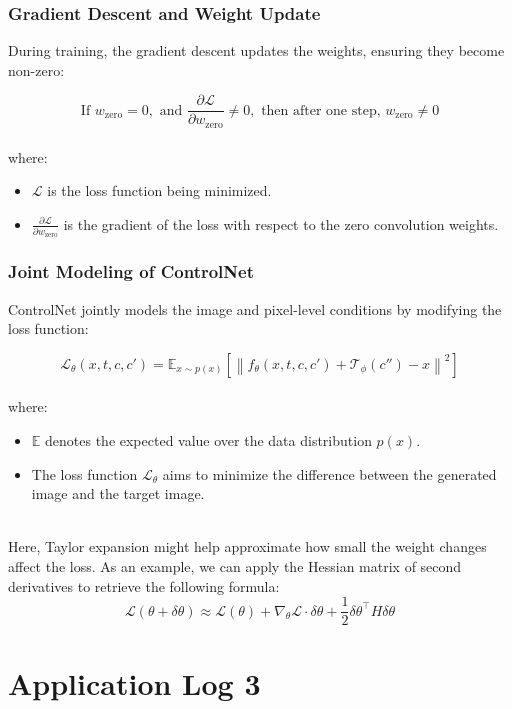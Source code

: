\documentclass[12pt]{article}
\begin{document}
\subsubsection*{Gradient Descent and Weight Update}

During training, the gradient descent updates the weights, ensuring they become non-zero:

\[
\text{If } w_{\text{zero}} = 0, \text{ and } \frac{\partial \mathcal{L}}{\partial w_{\text{zero}}} \neq 0, \text{ then after one step, } w_{\text{zero}} \neq 0
\]
\\
where:
\begin{itemize}
    \item $\mathcal{L}$ is the loss function being minimized.
    \item $\frac{\partial \mathcal{L}}{\partial w_{\text{zero}}}$ is the gradient of the loss with respect to the zero convolution weights.
\end{itemize}

\subsubsection*{Joint Modeling of ControlNet}

ControlNet jointly models the image and pixel-level conditions by modifying the loss function:

\[
\mathcal{L}_\theta(x, t, c, c') = \mathbb{E}_{x \sim p(x)} \left[ \left\| f_\theta(x, t, c, c') + \mathcal{T}_\phi(c'') - x \right\|^2 \right]
\]
\\
where:
\begin{itemize}
    \item $\mathbb{E}$ denotes the expected value over the data distribution $p(x)$.
    \item The loss function $\mathcal{L}_\theta$ aims to minimize the difference between the generated image and the target image.
\end{itemize}
\\
Here, Taylor expansion might help approximate how small the weight changes affect the loss. As an example, we can apply the Hessian matrix of second derivatives to retrieve the following formula:
\[
    \mathcal{L}(\theta + \delta \theta) \approx \mathcal{L}(\theta) + \nabla_\theta \mathcal{L} \cdot \delta \theta + \frac{1}{2} \delta \theta^\top H \delta \theta
\]

\newpage

\section{Application Log 3}
\end{document}
